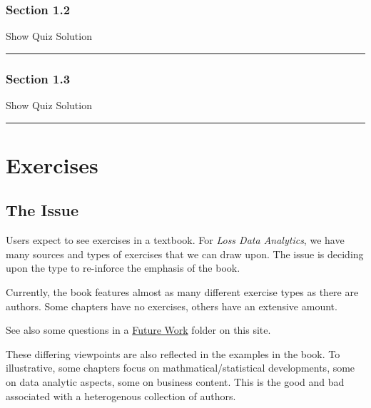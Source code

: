 \documentclass[
]{book}
\begin{document}
\hypertarget{section-1.2}{%
\subsection{Section 1.2}\label{section-1.2}}

\hypertarget{surveyElement12}{}

\hypertarget{surveyResult12}{}

Show Quiz Solution

\hypertarget{display.Quiz12.2}{}
\begin{center}\rule{0.5\linewidth}{0.5pt}\end{center}

\hypertarget{section-1.3}{%
\subsection{Section 1.3}\label{section-1.3}}

\hypertarget{surveyElement13}{}

\hypertarget{surveyResult13}{}

Show Quiz Solution

\hypertarget{display.Quiz13.2}{}
\begin{center}\rule{0.5\linewidth}{0.5pt}\end{center}

\hypertarget{S:Exercises}{%
\chapter{Exercises}\label{S:Exercises}}

\hypertarget{the-issue}{%
\section{The Issue}\label{the-issue}}

Users expect to see exercises in a textbook. For \emph{Loss Data Analytics}, we have many sources and types of exercises that we can draw upon. The issue is deciding upon the type to re-inforce the emphasis of the book.

Currently, the book features almost as many different exercise types as there are authors. Some chapters have no exercises, others have an extensive amount.

See also some questions in a \href{https://github.com/ewfrees/InteractiveLDA/tree/master/FutureWork}{Future Work} folder on this site.

These differing viewpoints are also reflected in the examples in the book. To illustrative, some chapters focus on mathmatical/statistical developments, some on data analytic aspects, some on business content. This is the good and bad associated with a heterogenous collection of authors.
\end{document}
